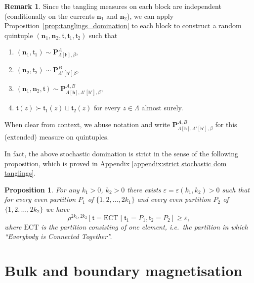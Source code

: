 \documentclass[11pt,a4paper]{article}
\newtheorem{proposition}[theorem]{Proposition}
\theoremstyle{definition}
\newtheorem{remark}[theorem]{Remark}
\numberwithin{equation}{section}
\newcommand\n{\mathbf{n}}
\newcommand\ft{\mathfrak{t}}
\begin{document}
\begin{remark}\label{rem:extended_measure}
    Since the tangling measures on each block are independent (conditionally on the currents $\n_1$ and $\n_2$), we can apply Proposition~\textup{\ref{prop:tanglings_domination}} to each block to construct a random quintuple $(\n_1,\n_2,\ft,\ft_1,\ft_2)$ such that
    \begin{enumerate}[label=(\alph*)]
        \item $(\n_1,\ft_1)\sim \mathbf{P}^A_{\Lambda[\mathsf{h}],\beta}$, 
        \item $(\n_2,\ft_2)\sim \mathbf{P}^B_{\Lambda'[\mathsf{h}']\beta}$,
        \item $(\n_1,\n_2,\ft)\sim \mathbf{P}^{A,B}_{\Lambda[\mathsf{h}],\Lambda'[\mathsf{h}'],\beta}$,
        \item $\ft(z) \succ \ft_1(z) \sqcup \ft_2(z)$ for every $z\in\Lambda$ almost surely.
    \end{enumerate} 
    When clear from context, we abuse notation and write $\mathbf{P}^{A,B}_{\Lambda[\mathsf{h}],\Lambda'[\mathsf{h}'],\beta}$ for this (extended) measure on quintuples.
\end{remark}

In fact, the above stochastic domination is strict in the sense of the following proposition, which is proved in Appendix \ref{appendix:strict stochastic dom tanglings}.

\begin{proposition}\label{prop: tanglings ECT}
For any $k_1>0$, $k_2>0$ there exists $\varepsilon=\varepsilon(k_1,k_2)>0$ such that for every even partition $P_1$ of $\{1,2,\ldots,2k_1\}$ and every even partition $P_2$ of $\{1,2,\ldots,2k_2\}$ we have
\begin{equation}
\rho^{2k_1,2k_2}[\mathfrak t = \mathrm{ECT} \mid \mathfrak t_1=P_1,\mathfrak t_2=P_2]\geq \varepsilon,    
\end{equation}
where $\mathrm{ECT}$ is the partition consisting of one element, i.e.\ the partition in which ``Everybody is Connected Together''.
\end{proposition}




\section{Bulk and boundary magnetisation}
\label{sec:magnetisation}
\end{document}
